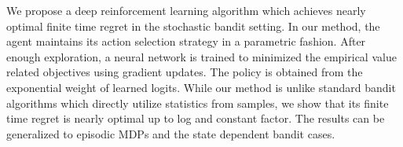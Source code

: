 We propose a deep reinforcement learning algorithm which achieves nearly optimal finite time regret in the stochastic bandit setting. In our method, the agent maintains its action selection strategy in a parametric fashion. After enough exploration, a neural network is trained to minimized the empirical value related objectives using gradient updates. The policy is obtained from the exponential weight of learned logits. While our method is unlike standard bandit algorithms which directly utilize statistics from samples, we show that its finite time regret is nearly optimal up to log and constant factor. The results can be generalized to episodic MDPs and the state dependent bandit cases.